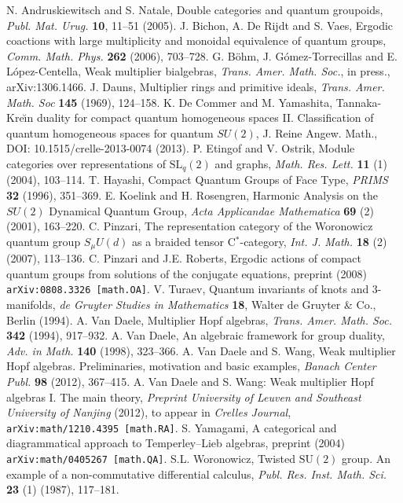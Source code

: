 \documentclass[11pt]{article}
\newcommand{\SSL}{\mathrm{SL}}
\theoremstyle{definition}
\numberwithin{equation}{section}
\begin{document}
\begin{thebibliography}{99}
 N. Andruskiewitsch and S. Natale, Double categories and quantum groupoids, \emph{Publ. Mat. Urug.} \textbf{10}, 11--51 (2005).
 J. Bichon, A. De Rijdt and S. Vaes, Ergodic coactions with large multiplicity and monoidal equivalence of quantum groups, \emph{Comm. Math. Phys.} \textbf{262} (2006), 703--728.
  G. B\"{o}hm, J. Gómez-Torrecillas and E. López-Centella, Weak multiplier bialgebras, \emph{Trans. Amer. Math. Soc.}, in press., arXiv:1306.1466. 
 J. Dauns, Multiplier rings and primitive ideals, \emph{Trans. Amer. Math. Soc} \textbf{145} (1969), 124--158.
 K. De Commer and M. Yamashita, Tannaka-Kre\u{\i}n duality for compact quantum homogeneous spaces II. Classification of quantum homogeneous spaces for quantum $SU(2)$, J. Reine Angew. Math., DOI: 10.1515/crelle-2013-0074 (2013).
 P. Etingof and V. Ostrik, Module categories over representations of $\SSL_q(2)$ and graphs, \emph{Math. Res. Lett.} \textbf{11} (1) (2004), 103--114.
 T. Hayashi, Compact Quantum Groups of Face Type, \emph{PRIMS} \textbf{32} (1996), 351--369.
  E. Koelink and H. Rosengren, Harmonic Analysis on the $SU(2)$ Dynamical Quantum Group, \emph{Acta Applicandae Mathematica} \textbf{69} (2) (2001), 163--220.
 C. Pinzari, The representation category of the Woronowicz quantum group $S_{\mu}U(d)$ as a braided tensor C$^*$-category, \emph{Int. J. Math.} \textbf{18} (2) (2007), 113--136.
 C. Pinzari and J.E. Roberts, Ergodic actions of compact quantum groups from solutions of the conjugate equations, preprint (2008) {\tt arXiv:0808.3326 [math.OA]}.
 V. Turaev, Quantum invariants of knots and 3-manifolds, \emph{de Gruyter Studies in Mathematics} \textbf{18}, Walter de Gruyter \& Co., Berlin (1994).
 A. Van Daele, Multiplier Hopf algebras, \emph{Trans. Amer. Math. Soc.} \textbf{342} (1994), 917--932.
 A. Van Daele, An algebraic framework for group duality, \emph{Adv. in Math.} \textbf{140} (1998), 323--366.
 A. Van Daele and  S. Wang, Weak multiplier Hopf algebras. Preliminaries, motivation and basic examples, \emph{Banach Center Publ.} \textbf{98} (2012), 367--415.
 A. Van Daele and S. Wang: Weak multiplier Hopf algebras I. The main theory, \emph{Preprint University of Leuven and Southeast University of Nanjing} (2012), to appear in
\emph{Crelles Journal}, {\tt arXiv:math/1210.4395 [math.RA]}.
 S. Yamagami, A categorical and diagrammatical approach to Temperley--Lieb algebras, preprint (2004) {\tt arXiv:math/0405267 [math.QA]}.
 S.L. Woronowicz, Twisted $\mathrm{SU}(2)$ group. An example of a non-commutative differential calculus, \emph{Publ. Res. Inst. Math. Sci.} \textbf{23} (1) (1987), 117--181.
\end{thebibliography}
\end{document}
